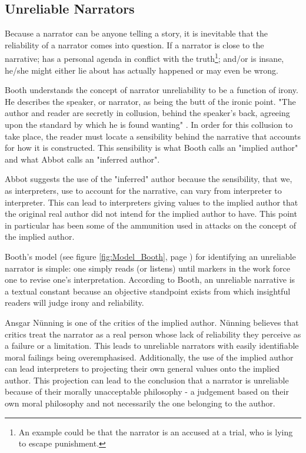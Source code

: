\subsection{Unreliable Narrators}
Because a narrator can be anyone telling a story, it is inevitable that the reliability of a narrator comes into question. If a narrator is close to the narrative; has a personal agenda in conflict with the truth\footnote{An example could be that the narrator is an accused at a trial, who is lying to escape punishment.}; and/or is insane, he/she might either lie about has actually happened or may even be wrong. 

Booth understands the concept of narrator unreliability to be a function of irony. He describes the speaker, or narrator, as being the butt of the ironic point. "The author and reader are secretly in collusion, behind the speaker's back, agreeing upon the standard by which he is found wanting" \cite[p. 94]{Olson}. In order for this collusion to take place, the reader must locate a sensibility behind the narrative that accounts for how it is constructed. This sensibility is what Booth calls an "implied author" \cite[p. 94]{Olson} and what Abbot calls an "inferred author"\cite[p. 84-85]{Abbot}.

Abbot suggests the use of the "inferred" author because the sensibility, that we, as interpreters, use to account for the narrative, can vary from interpreter to interpreter. This can lead to interpreters giving values to the implied author that the original real author did not intend for the implied author to have. This point in particular has been some of the ammunition used in attacks on the concept of the implied author.\cite[p.85]{Abbot}


Booth's model (see figure \ref{fig:Model_Booth}, page \pageref{fig:Model_Booth}) for identifying an unreliable narrator is simple: one simply reads (or listens) until markers in the work force one to revise one's interpretation. According to Booth, an unreliable narrative is a textual constant because an objective standpoint exists from which insightful readers will judge irony and reliability.\cite[p. 95]{Olson}

Ansgar N\"unning is one of the critics of the implied author. N\"unning believes that critics treat the narrator as a real person whose lack of reliability they perceive as a failure or a limitation. This leads to unreliable narrators with easily identifiable moral failings being overemphasised. Additionally, the use of the implied author can lead interpreters to projecting their own general values onto the implied author. This projection can lead to the conclusion that a narrator is unreliable because of their morally unacceptable philosophy - a judgement based on their own moral philosophy and not necessarily the one belonging to the author. \cite[p. 96-97]{Olson} 

